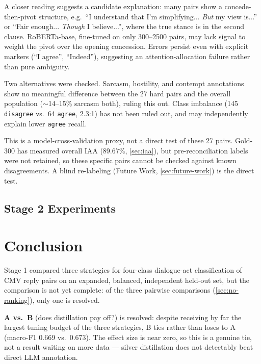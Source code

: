 A closer reading suggests a candidate explanation: many pairs show a
concede-then-pivot structure, e.g.\ ``I understand that I'm simplifying...
\emph{But} my view is...'' or ``Fair enough... \emph{Though} I
believe...'', where the true stance is in the second clause. RoBERTa-base,
fine-tuned on only 300--2500 pairs, may lack signal to weight the pivot
over the opening concession. Errors persist even with explicit markers
(``I agree'', ``Indeed''), suggesting an attention-allocation failure
rather than pure ambiguity.

Two alternatives were checked. Sarcasm, hostility, and contempt
annotations show no meaningful difference between the 27 hard pairs and
the overall population ($\sim$14--15\% sarcasm both), ruling this out.
Class imbalance (145 \texttt{disagree} vs.\ 64 \texttt{agree}, 2.3:1) has
not been ruled out, and may independently explain lower \texttt{agree}
recall.

This is a model-cross-validation proxy, not a direct test of these 27
pairs. Gold-300 has measured overall IAA (89.67\%, \autoref{sec:iaa}),
but pre-reconciliation labels were not retained, so these specific pairs
cannot be checked against known disagreements. A blind re-labeling
(Future Work, \autoref{sec:future-work}) is the direct test.

\section{Stage 2 Experiments}



\chapter{Conclusion}
\label{c:conclusions}

Stage 1 compared three strategies for four-class dialogue-act
classification of CMV reply pairs on an expanded, balanced, independent
held-out set, but the comparison is not yet complete: of the three
pairwise comparisons (\autoref{sec:no-ranking}), only one is
resolved.

\textbf{A vs.\ B} (does distillation pay off?) is resolved: despite
receiving by far the largest tuning budget of the three strategies, B
ties rather than loses to A (macro-F1 0.669 vs.\ 0.673). The effect size
is near zero, so this is a genuine tie, not a result waiting on more
data --- silver distillation does not detectably beat direct LLM
annotation.

